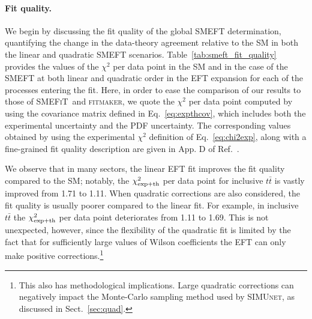 \documentclass[withindex,glossary]{cam-thesis}
\newcommand{\simunet}{\textsc{SIMUnet}}
\newcommand{\fitm}{\textsc{fitmaker}}
\newcommand{\smefit}{\textsc{SMEFiT}}
\begin{document}
\paragraph{Fit quality.}
We begin by discussing the fit quality of the global SMEFT determination, quantifying 
the change in the data-theory agreement relative to the SM in both the linear and quadratic SMEFT
scenarios.  Table~\ref{tab:smeft_fit_quality} provides the values of the $\chi^2$ per data point in the SM and in the case of 
the SMEFT at both linear and quadratic order in the EFT expansion for
each of the processes entering the fit.
Here, in order to ease the comparison of our results to those of
\smefit{}~and \fitm, we quote the $\chi^2$ per data point computed
by using the covariance matrix defined in Eq.~\eqref{eq:expthcov},
which includes both the experimental uncertainty and the PDF
uncertainty. The corresponding values obtained by using the
experimental $\chi^2$ definition of Eq.~\eqref{eq:chi2exp}, along with
a fine-grained fit quality description are given in App. D of Ref.~\cite{Kassabov:2023hbm}.

We observe that in many sectors, the linear EFT fit improves the fit
quality compared to the SM; notably, the $\chi^2_{\rm exp+th}$ per data point for inclusive $t\bar{t}$ is vastly improved from 1.71 to 1.11. When
quadratic corrections are also considered, the fit quality is usually poorer compared to the linear fit. For example,
in inclusive $t\bar{t}$ the $\chi^2_{\rm exp+th}$ per data point deteriorates from 1.11 to 1.69. This is not unexpected, however,
since the flexibility of the quadratic fit is limited by the fact that 
for sufficiently large values of Wilson coefficients the EFT can only
make positive corrections.\footnote{This also has methodological implications.
Large quadratic corrections can negatively impact the Monte-Carlo sampling method
used by \simunet, as discussed in Sect.~\ref{sec:quad}.} 
\end{document}
